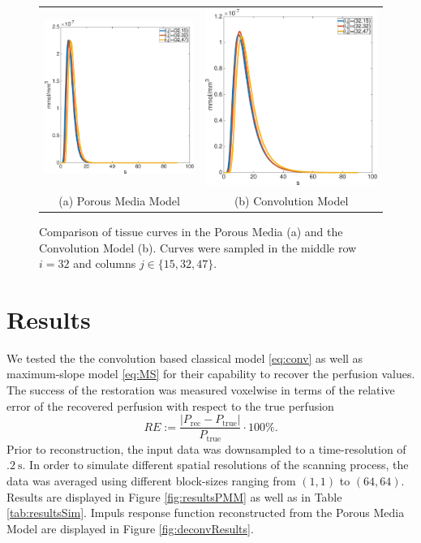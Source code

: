 \documentclass[paper=a4, fontsize=11pt,parskip=half,headings=small]{scrartcl}
\begin{document}
	\begin{figure}[H]
		\centering
		\begin{tabular}{c c}
			\includegraphics[width=.45\textwidth]{figs/PMM153247.eps} & \includegraphics[width=.45\textwidth]{figs/convM153247.eps} \\
			(a) Porous Media Model & (b) Convolution Model
		\end{tabular}
		\caption{Comparison of tissue curves in the Porous Media (a) and the Convolution Model (b). Curves were sampled in the middle row $i=32$ and columns $j \in \{15,32,47\}$.}
		\label{fig:tissuecomp}
	\end{figure}
	
	

	\section{Results}\label{sec:results}

	We tested the the convolution based classical model \eqref{eq:conv} as well as maximum-slope model \eqref{eq:MS} for their capability to recover the perfusion values.
	The success of the restoration was measured voxelwise in terms of the relative error of the recovered perfusion with respect to the true perfusion
	\[
		RE := \frac{\vert P_{\mathrm{rec}} - P_{\mathrm{true}}\vert}{P_{\mathrm{true}}}\cdot 100\%.
	\]
	Prior to reconstruction, the input data was downsampled to a time-resolution of $\SI{.2}{\second}$.
	In order to simulate different spatial resolutions of the scanning process, the data was averaged using different block-sizes ranging from $(1,1)$ to $(64,64)$.
	Results are displayed in Figure \ref{fig:resultsPMM} as well as in Table \ref{tab:resultsSim}.
	Impuls response function reconstructed from the Porous Media Model are displayed in Figure \ref{fig:deconvResults}.	
	
\end{document}
